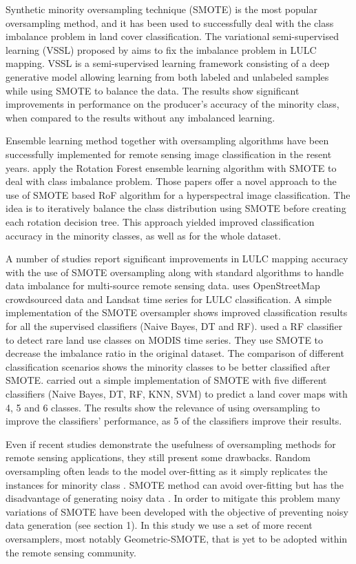 \documentclass[parskip=full]{scrartcl}
\begin{document}
Synthetic minority oversampling technique (SMOTE) \cite{Chawla2002} is the most
popular oversampling method, and it has been used to successfully deal with the
class imbalance problem in land cover classification. The variational
semi-supervised learning (VSSL) proposed by \cite{Cenggoro2018} aims to fix the
imbalance problem in LULC mapping. VSSL is a semi-supervised learning framework
consisting of a deep generative model allowing learning from both labeled
and unlabeled samples while using SMOTE to balance the data. The results show
significant improvements in performance on the producer’s accuracy of the
minority class, when compared to the results without any imbalanced learning.

Ensemble learning method together with oversampling algorithms have been
successfully implemented for remote sensing image classification in the resent
years. \cite{Feng2018, Feng2019} apply the Rotation Forest ensemble
learning algorithm with SMOTE to deal with class imbalance problem. Those
papers offer a novel approach to the use of SMOTE based RoF algorithm for a
hyperspectral image classification. The idea is to iteratively balance the
class distribution using SMOTE before creating each rotation decision tree.
This approach yielded improved classification accuracy in the
minority classes,  as well as for the whole dataset.

A number of studies report significant improvements in LULC mapping accuracy
with the use of SMOTE oversampling along with standard algorithms to handle
data imbalance for multi-source remote sensing data. \cite{Johnson2016} uses
OpenStreetMap crowdsourced data and Landsat time series for LULC
classification. A simple implementation of the SMOTE oversampler shows improved
classification results for all the supervised classifiers (Naive Bayes, DT and
RF). \cite{Bogner2018} used a RF classifier to detect rare land use classes on
MODIS time series. They use SMOTE to decrease the imbalance ratio in the
original dataset. The comparison of different classification scenarios shows
the minority classes to be better classified after SMOTE. \cite{Panda2018}
carried out a simple implementation of SMOTE with five different classifiers
(Naive Bayes, DT, RF, KNN, SVM) to predict a land cover maps with 4, 5 and 6
classes. The results show the relevance of using oversampling to improve the
classifiers' performance, as 5 of the classifiers improve their results.

Even if recent studies demonstrate the usefulness of oversampling methods
for remote sensing applications, they still present some drawbacks. Random
oversampling often leads to the model over-fitting as it simply replicates the
instances for minority class \cite{Feng2019}. SMOTE method can avoid
over-fitting but has the disadvantage of generating noisy data \cite{He2008}.
In order to mitigate this problem many variations of SMOTE have been developed
with the objective of preventing noisy data generation (see section 1). In this
study we use a set of more recent oversamplers, most notably Geometric-SMOTE,
that is yet to be adopted within the remote sensing community.
\end{document}
